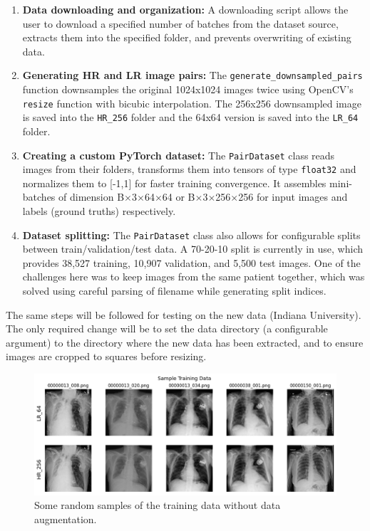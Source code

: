 \documentclass{article} %
\begin{document}
\begin{enumerate}
    \item \textbf{Data downloading and organization:} A downloading script allows the user to download a specified number of batches from the dataset source, extracts them into the specified folder, and prevents overwriting of existing data.
    
    \item \textbf{Generating HR and LR image pairs:} The \texttt{generate\_downsampled\_pairs} function downsamples the original 1024x1024 images twice using OpenCV’s \texttt{resize} function with bicubic interpolation. The 256x256 downsampled image is saved into the \texttt{HR\_256} folder and the 64x64 version is saved into the \texttt{LR\_64} folder.
    
    \item \textbf{Creating a custom PyTorch dataset:} The \texttt{PairDataset} class reads images from their folders, transforms them into tensors of type \texttt{float32} and normalizes them to [-1,1] for faster training convergence. It assembles mini-batches of dimension B$\times$3$\times$64$\times$64 or B$\times$3$\times$256$\times$256 for input images and labels (ground truths) respectively.
    
    \item \textbf{Dataset splitting:} The \texttt{PairDataset} class also allows for configurable splits between train/validation/test data. A 70-20-10 split is currently in use, which provides 38,527 training, 10,907 validation, and 5,500 test images. One of the challenges here was to keep images from the same patient together, which was solved using careful parsing of filename while generating split indices.
\end{enumerate}

The same steps will be followed for testing on the new data (Indiana University). The only required change will be to set the data directory (a configurable argument) to the directory where the new data has been extracted, and to ensure images are cropped to squares before resizing.

\begin{figure}[h]
\begin{center}
\includegraphics[width=1\textwidth]{Figs/training_samples.png}
\end{center}
\caption{Some random samples of the training data without data augmentation.}
\label{training_samples}
\end{figure}
\end{document}
